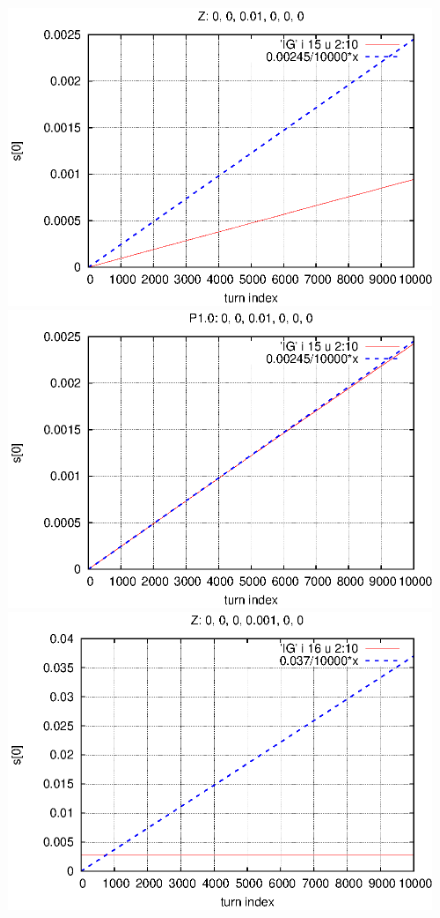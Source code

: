 \documentclass[]{article}
\begin{document}
%
\begin{figure}[h]
\centering
\includegraphics[scale=0.6]{eps/SpinEvolve15.Z.eps}
\includegraphics[scale=0.6]{eps/SpinEvolve15.P1.0.eps}
\includegraphics[scale=0.6]{eps/SpinEvolve16.Z.eps}

\end{figure}
\end{document}
